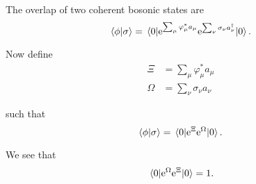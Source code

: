 The overlap of two coherent bosonic states are
\begin{equation}
\braket{\phi}{\sigma} = \mel{0}{\mathrm{e}^{\sum_\mu\varphi_\mu^*a_\mu}\mathrm{e}^{\sum_\nu\sigma_\nu a_\nu^\dagger}}{0}.
\end{equation}

Now define 
\begin{align*}
\Xi &= \sum_\mu\varphi_\mu^*a_\mu \\
\Omega &= \sum_\nu\sigma_\nu a_\nu
\end{align*}

such that 
\begin{equation}
\braket{\phi}{\sigma} = \mel{0}{\mathrm{e}^{\Xi}\mathrm{e}^{\Omega}}{0}.
\end{equation}

We see that 
\begin{equation}
\mel{0}{\mathrm{e}^{\Omega}\mathrm{e}^{\Xi}}{0} = 1.
\end{equation}